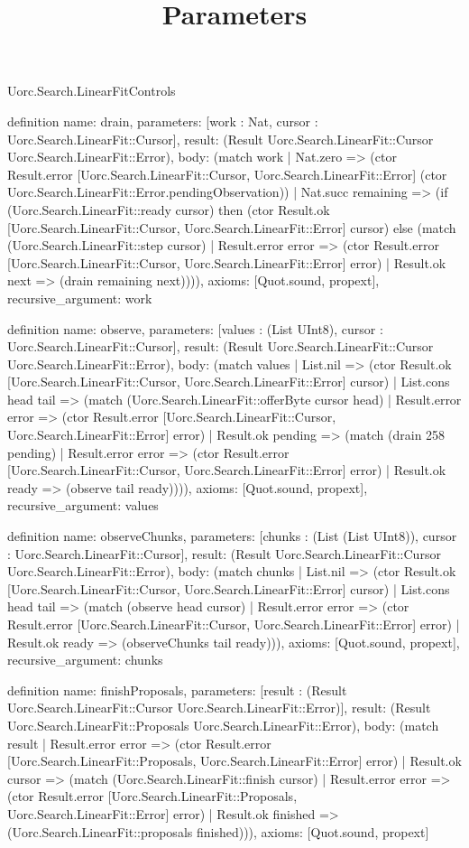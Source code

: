 \begin{lexlean}{Uorc.Search.LinearFitControls}
\title{Parameters}
\begin{semanticmodule}
definition{
  name: drain,
  parameters: [work : Nat, cursor : Uorc.Search.LinearFit::Cursor],
  result: (Result Uorc.Search.LinearFit::Cursor Uorc.Search.LinearFit::Error),
  body: (match work
    | Nat.zero => (ctor Result.error [Uorc.Search.LinearFit::Cursor, Uorc.Search.LinearFit::Error] (ctor Uorc.Search.LinearFit::Error.pendingObservation))
    | Nat.succ remaining => (if (Uorc.Search.LinearFit::ready cursor) then (ctor Result.ok [Uorc.Search.LinearFit::Cursor, Uorc.Search.LinearFit::Error] cursor) else (match (Uorc.Search.LinearFit::step cursor)
      | Result.error error => (ctor Result.error [Uorc.Search.LinearFit::Cursor, Uorc.Search.LinearFit::Error] error)
      | Result.ok next => (drain remaining next)))),
  axioms: [Quot.sound, propext],
  recursive_argument: work
}

definition{
  name: observe,
  parameters: [values : (List UInt8), cursor : Uorc.Search.LinearFit::Cursor],
  result: (Result Uorc.Search.LinearFit::Cursor Uorc.Search.LinearFit::Error),
  body: (match values
    | List.nil => (ctor Result.ok [Uorc.Search.LinearFit::Cursor, Uorc.Search.LinearFit::Error] cursor)
    | List.cons head tail => (match (Uorc.Search.LinearFit::offerByte cursor head)
      | Result.error error => (ctor Result.error [Uorc.Search.LinearFit::Cursor, Uorc.Search.LinearFit::Error] error)
      | Result.ok pending => (match (drain 258 pending)
        | Result.error error => (ctor Result.error [Uorc.Search.LinearFit::Cursor, Uorc.Search.LinearFit::Error] error)
        | Result.ok ready => (observe tail ready)))),
  axioms: [Quot.sound, propext],
  recursive_argument: values
}

definition{
  name: observeChunks,
  parameters: [chunks : (List (List UInt8)), cursor : Uorc.Search.LinearFit::Cursor],
  result: (Result Uorc.Search.LinearFit::Cursor Uorc.Search.LinearFit::Error),
  body: (match chunks
    | List.nil => (ctor Result.ok [Uorc.Search.LinearFit::Cursor, Uorc.Search.LinearFit::Error] cursor)
    | List.cons head tail => (match (observe head cursor)
      | Result.error error => (ctor Result.error [Uorc.Search.LinearFit::Cursor, Uorc.Search.LinearFit::Error] error)
      | Result.ok ready => (observeChunks tail ready))),
  axioms: [Quot.sound, propext],
  recursive_argument: chunks
}

definition{
  name: finishProposals,
  parameters: [result : (Result Uorc.Search.LinearFit::Cursor Uorc.Search.LinearFit::Error)],
  result: (Result Uorc.Search.LinearFit::Proposals Uorc.Search.LinearFit::Error),
  body: (match result
    | Result.error error => (ctor Result.error [Uorc.Search.LinearFit::Proposals, Uorc.Search.LinearFit::Error] error)
    | Result.ok cursor => (match (Uorc.Search.LinearFit::finish cursor)
      | Result.error error => (ctor Result.error [Uorc.Search.LinearFit::Proposals, Uorc.Search.LinearFit::Error] error)
      | Result.ok finished => (Uorc.Search.LinearFit::proposals finished))),
  axioms: [Quot.sound, propext]
}


\end{semanticmodule}
\end{lexlean}
